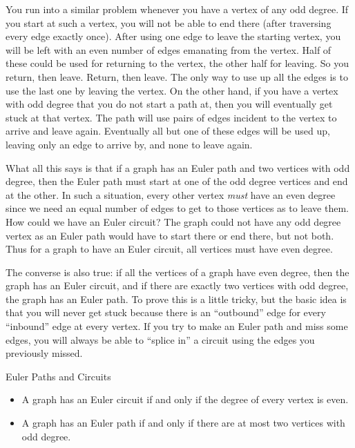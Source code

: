 \documentclass[12pt]{article}
\begin{document}
You run into a similar problem whenever you have a vertex of any odd degree.  If you start at such a vertex, you will not be able to end there (after traversing every edge exactly once).  After using one edge to leave the starting vertex, you will be left with an even number of edges emanating from the vertex.  Half of these could be used for returning to the vertex, the other half for leaving.  So you return, then leave.  Return, then leave.  The only way to use up all the edges is to use the last one by leaving the vertex.  On the other hand, if you have a vertex with odd degree that you do not start a path at, then you will eventually get stuck at that vertex.  The path will use pairs of edges incident to the vertex to arrive and leave again.  Eventually all but one of these edges will be used up, leaving only an edge to arrive by, and none to leave again.

What all this says is that if a graph has an Euler path and two vertices with odd degree, then the Euler path must start at one of the odd degree vertices and end at the other.  In such a situation, every other vertex {\em must} have an even degree since we need an equal number of edges to get to those vertices as to leave them.  How could we have an Euler circuit?  The graph could not have any odd degree vertex as an Euler path would have to start there or end there, but not both.  Thus for a graph to have an Euler circuit, all vertices must have even degree.

The converse is also true: if all the vertices of a graph have even degree, then the graph has an Euler circuit, and if there are exactly two vertices with odd degree, the graph has an Euler path.  To prove this is a little tricky, but the basic idea is that you will never get stuck because there is an ``outbound'' edge for every ``inbound'' edge at every vertex.  If you try to make an Euler path and miss some edges, you will always be able to ``splice in'' a circuit using the edges you previously missed.

\begin{defbox}{Euler Paths and Circuits}
\begin{itemize}
 \item A graph has an Euler circuit if and only if the degree of every vertex is even.
 \item A graph has an Euler path if and only if there are at most two vertices with odd degree.
\end{itemize}

\end{defbox}
\end{document}
